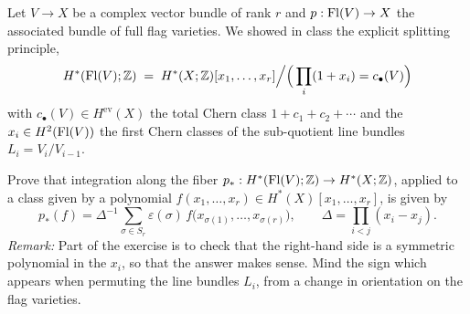 \documentclass[12pt]{article}  %
\begin{document}
\begin{problem}[3]
Let $V \to X$ be a complex vector bundle of rank $r$ and $p : \operatorname{Fl}(V ) \to X$ the associated bundle of full
flag varieties. We showed in class the explicit splitting principle,
\[
H^{*}(\operatorname{Fl}(V);\mathbb{Z})
\;=\;
H^{*}(X;\mathbb{Z})[x_1,\dots,x_r]\Big/\Big(\prod_i(1+x_i)=c_{\bullet}(V)\Big)
\]
with $c_{\bullet}(V) \in H^{\mathrm{ev}}(X)$ the total Chern class $1+c_1+c_2+\cdots$ and the
$x_i \in H^{2}(\operatorname{Fl}(V))$ the first Chern classes of the sub-quotient line bundles $L_i = V_i/V_{i-1}$.

Prove that integration along the fiber $p_* : H^{*}(\operatorname{Fl}(V);\mathbb{Z}) \to H^{*}(X;\mathbb{Z})$, applied to a class given by a
polynomial $f(x_1,\dots,x_r)\in H^{*}(X)[x_1,\dots,x_r]$, is given by
\[
p_*(f)
=
\Delta^{-1}\sum_{\sigma\in S_r}\varepsilon(\sigma)\,
f\bigl(x_{\sigma(1)},\dots,x_{\sigma(r)}\bigr),
\qquad
\Delta=\prod_{i<j}(x_i-x_j).
\]
\noindent\textit{Remark:} Part of the exercise is to check that the right-hand side is a symmetric polynomial in the
$x_i$, so that the answer makes sense. Mind the sign which appears when permuting the line bundles
$L_i$, from a change in orientation on the flag varieties.
\end{problem}
\end{document}
